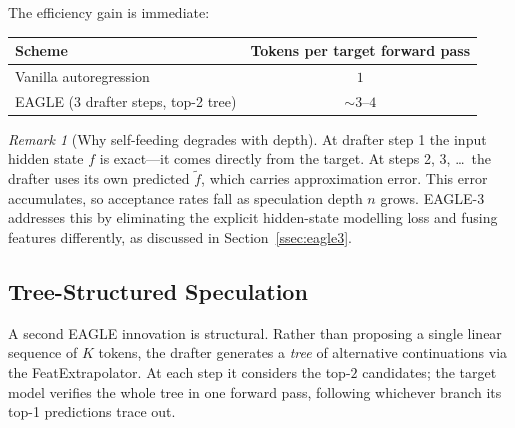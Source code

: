 \documentclass[11pt,a4paper]{article}
\theoremstyle{definition}
\theoremstyle{remark}
\newtheorem*{remark}{Remark}
\theoremstyle{plain}
\begin{document}
The efficiency gain is immediate:

\begin{center}
\renewcommand{\arraystretch}{1.25}
\begin{tabular}{@{}lc@{}}
\toprule
\textbf{Scheme} & \textbf{Tokens per target forward pass} \\
\midrule
Vanilla autoregression & $1$ \\
EAGLE (3 drafter steps, top-2 tree) & ${\sim}3$--$4$ \\
\bottomrule
\end{tabular}
\end{center}

\begin{remark}[Why self-feeding degrades with depth]
At drafter step 1 the input hidden state $f$ is exact---it comes directly
from the target. At steps 2, 3, \ldots\ the drafter uses its own predicted
$\tilde{f}$, which carries approximation error. This error accumulates, so
acceptance rates fall as speculation depth $n$ grows. EAGLE-3 addresses
this by eliminating the explicit hidden-state modelling loss and fusing
features differently, as discussed in Section~\ref{ssec:eagle3}.
\end{remark}

\subsection{Tree-Structured Speculation}

A second EAGLE innovation is structural. Rather than proposing a single
linear sequence of $K$ tokens, the drafter generates a \emph{tree} of
alternative continuations via the FeatExtrapolator. At each step it
considers the top-$2$ candidates; the target model verifies the whole tree
in one forward pass, following whichever branch its top-1 predictions
trace out.

\begin{center}
\end{center}
\end{document}

